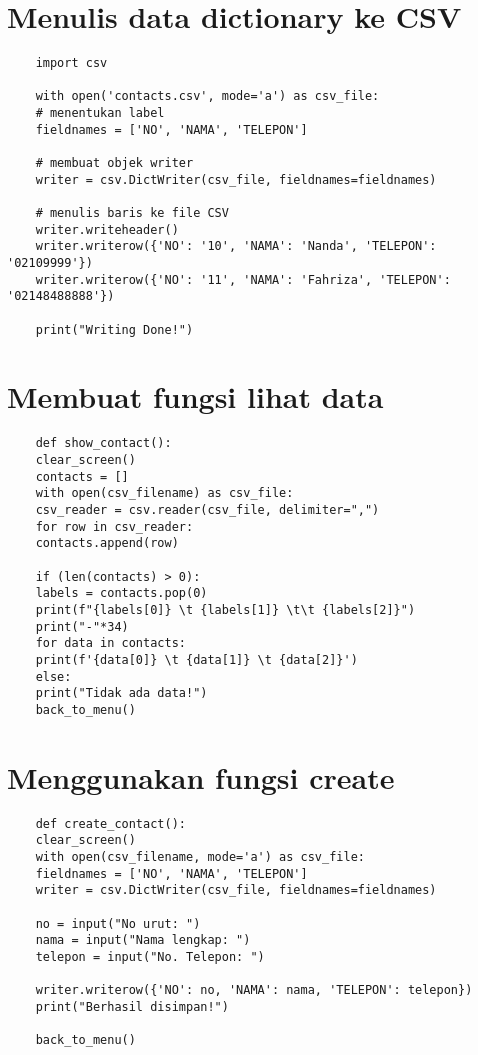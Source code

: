 \documentclass{article}
\begin{document}
\section{ Menulis data dictionary ke CSV}
\begin{lstlisting}
	import csv
	
	with open('contacts.csv', mode='a') as csv_file:
	# menentukan label
	fieldnames = ['NO', 'NAMA', 'TELEPON']
	
	# membuat objek writer
	writer = csv.DictWriter(csv_file, fieldnames=fieldnames)
	
	# menulis baris ke file CSV
	writer.writeheader()
	writer.writerow({'NO': '10', 'NAMA': 'Nanda', 'TELEPON': '02109999'})
	writer.writerow({'NO': '11', 'NAMA': 'Fahriza', 'TELEPON': '02148488888'})
	
	print("Writing Done!")
\end{lstlisting}

\section{Membuat fungsi lihat data}
\begin{lstlisting}
	def show_contact():
	clear_screen()
	contacts = []
	with open(csv_filename) as csv_file:
	csv_reader = csv.reader(csv_file, delimiter=",")
	for row in csv_reader:
	contacts.append(row)
	
	if (len(contacts) > 0):
	labels = contacts.pop(0)
	print(f"{labels[0]} \t {labels[1]} \t\t {labels[2]}")
	print("-"*34)
	for data in contacts:
	print(f'{data[0]} \t {data[1]} \t {data[2]}')
	else:
	print("Tidak ada data!")
	back_to_menu()
\end{lstlisting}

\section{Menggunakan fungsi create}
\begin{lstlisting}
	def create_contact():
	clear_screen()
	with open(csv_filename, mode='a') as csv_file:
	fieldnames = ['NO', 'NAMA', 'TELEPON']
	writer = csv.DictWriter(csv_file, fieldnames=fieldnames)
	
	no = input("No urut: ")
	nama = input("Nama lengkap: ")
	telepon = input("No. Telepon: ")
	
	writer.writerow({'NO': no, 'NAMA': nama, 'TELEPON': telepon})    
	print("Berhasil disimpan!")
	
	back_to_menu()
\end{lstlisting}
\end{document}
